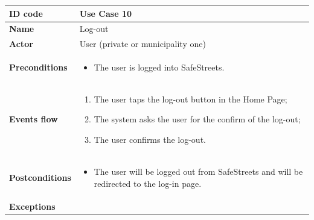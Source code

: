 \documentclass[titlepage]{article}
\begin{document}
\begin{longtable}{| p{3 cm} | p{10 cm} |} 
\hline


\textbf{ID code} & Use Case 10 \\ \hline
\textbf{Name} & Log-out \\ \hline
\textbf{Actor} & User (private or municipality one) \\ \hline
\textbf{Preconditions} & 
\begin{itemize}
\item The user is logged into SafeStreets.
\end{itemize}  \\ \hline

\textbf{Events flow} & 
\begin{enumerate}
\item The user taps the log-out button in the Home Page;
\item The system asks the user for the confirm of the log-out;
\item The user confirms the log-out.
\end{enumerate} \\ \hline

\textbf{Postconditions} & 
\begin{itemize}
\item The user will be logged out from SafeStreets and will be redirected to the log-in page.
\end{itemize} \\ \hline

\textbf{Exceptions} & \\ \hline



\end{longtable}

\newpage
\end{document}
